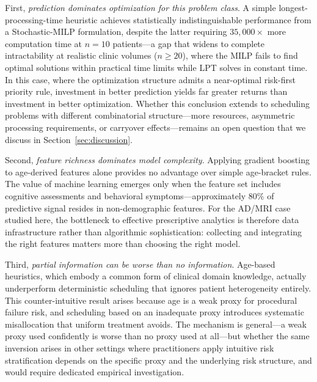 \documentclass[11pt,a4paper]{article}
\begin{document}
First, \textit{prediction dominates optimization for this problem class}. A simple longest-processing-time heuristic achieves statistically indistinguishable performance from a Stochastic-MILP formulation, despite the latter requiring $35{,}000\times$ more computation time at $n = 10$ patients---a gap that widens to complete intractability at realistic clinic volumes ($n \geq 20$), where the MILP fails to find optimal solutions within practical time limits while LPT solves in constant time. In this case, where the optimization structure admits a near-optimal risk-first priority rule, investment in better prediction yields far greater returns than investment in better optimization. Whether this conclusion extends to scheduling problems with different combinatorial structure---more resources, asymmetric processing requirements, or carryover effects---remains an open question that we discuss in Section~\ref{sec:discussion}.

Second, \textit{feature richness dominates model complexity}. Applying gradient boosting to age-derived features alone provides no advantage over simple age-bracket rules. The value of machine learning emerges only when the feature set includes cognitive assessments and behavioral symptoms---approximately 80\% of predictive signal resides in non-demographic features. For the AD/MRI case studied here, the bottleneck to effective prescriptive analytics is therefore data infrastructure rather than algorithmic sophistication: collecting and integrating the right features matters more than choosing the right model.

Third, \textit{partial information can be worse than no information}. Age-based heuristics, which embody a common form of clinical domain knowledge, actually underperform deterministic scheduling that ignores patient heterogeneity entirely. This counter-intuitive result arises because age is a weak proxy for procedural failure risk, and scheduling based on an inadequate proxy introduces systematic misallocation that uniform treatment avoids. The mechanism is general---a weak proxy used confidently is worse than no proxy used at all---but whether the same inversion arises in other settings where practitioners apply intuitive risk stratification depends on the specific proxy and the underlying risk structure, and would require dedicated empirical investigation.
\end{document}
